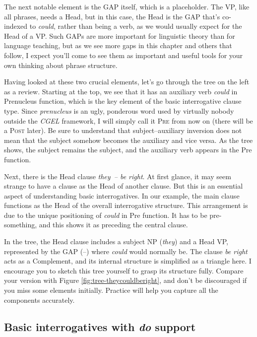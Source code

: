 The next notable element is the GAP itself, which is a placeholder. The VP, like all phrases, needs a \textsf{Head}, but in this case, the \textsf{Head} is the GAP that's co-indexed to \textit{could}, rather than being a verb, as we would usually expect for the \textsf{Head} of a VP. Such GAPs are more important for linguistic theory than for language teaching, but as we see more gaps in this chapter and others that follow, I expect you'll come to see them as important and useful tools for your own thinking about phrase structure.

Having looked at these two crucial elements, let's go through the tree on the left as a review. Starting at the top, we see that it has an auxiliary verb \textit{could} in \textsf{Prenucleus} function, which is the key element of the basic interrogative clause type. Since \textit{prenucleus} is an ugly, ponderous word used by virtually nobody outside the \textit{CGEL} framework, I will simply call it \textsc{Pre} from now on (there will be a \textsc{Post} later). Be sure to understand that subject--auxiliary inversion does not mean that the subject somehow becomes the auxiliary and vice versa. As the tree shows, the subject remains the subject, and the auxiliary verb appears in the \textsf{Pre} function.


Next, there is the \textsf{Head} clause \textit{they~-- be right}. At first glance, it may seem strange to have a clause as the \textsf{Head} of another clause. But this is an essential aspect of understanding basic interrogatives. In our example, the main clause functions as the \textsf{Head} of the overall interrogative structure. This arrangement is due to the unique positioning of \textit{could} in \textsf{Pre} function. It has to be pre-something, and this shows it as preceding the central clause.

In the tree, the \textsf{Head} clause includes a subject NP (\textit{they}) and a \textsf{Head} VP, represented by the GAP (--) where \textit{could} would normally be. The clause \textit{be right} acts as a \textsf{Complement}, and its internal structure is simplified as a triangle here. I encourage you to sketch this tree yourself to grasp its structure fully. Compare your version with Figure \ref{fig:tree-theycouldberight}, and don't be discouraged if you miss some elements initially. Practice will help you capture all the components accurately.

\subsection{Basic interrogatives with \textit{do} support}

